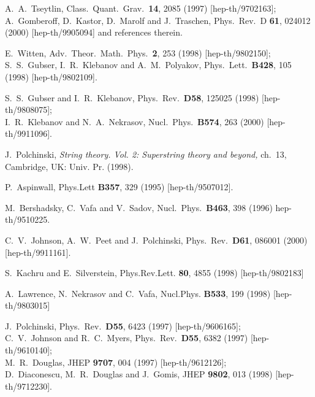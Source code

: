 \documentclass[a4paper,12pt]{article}
\renewcommand{\=}[1]{\bar{#1}}
\begin{document}
\begin{thebibliography}{10}
A.~A.~Tseytlin,
Class.\ Quant.\ Grav.\  {\bf 14}, 2085 (1997)
[hep-th/9702163];\\
A.~Gomberoff, D.~Kastor, D.~Marolf and J.~Traschen,
Phys.\ Rev.\ D {\bf 61}, 024012 (2000)
[hep-th/9905094] and references therein.

E.~Witten,
Adv.\ Theor.\ Math.\ Phys.\  {\bf 2}, 253 (1998)
[hep-th/9802150];\\
S.~S.~Gubser, I.~R.~Klebanov and A.~M.~Polyakov,
Phys.\ Lett.\  {\bf B428}, 105 (1998)
[hep-th/9802109].

S.~S.~Gubser and I.~R.~Klebanov,
Phys.\ Rev.\  {\bf D58}, 125025 (1998)
[hep-th/9808075];
\\
I.~R.~Klebanov and N.~A.~Nekrasov,
Nucl.\ Phys.\  {\bf B574}, 263 (2000)
[hep-th/9911096].

J.~Polchinski,
{\it String theory. Vol. 2: Superstring theory and beyond,} ch.\ 13,
Cambridge, UK: Univ. Pr. (1998).

P.~Aspinwall,
Phys.Lett {\bf B357}, 329 (1995)
[hep-th/9507012].

 M.~Bershadsky, C.~Vafa and V.~Sadov,
Nucl.\ Phys.\ {\bf B463}, 398 (1996)
hep-th/9510225.

C.~V.~Johnson, A.~W.~Peet and J.~Polchinski,
Phys.\ Rev.\  {\bf D61}, 086001 (2000)
[hep-th/9911161].

S.~Kachru and E.~Silverstein,
Phys.Rev.Lett. {\bf 80}, 4855 (1998)
[hep-th/9802183]

A.~Lawrence, N.~Nekrasov and C.~Vafa,
Nucl.Phys. {\bf B533}, 199 (1998)
[hep-th/9803015]

J.~Polchinski,
Phys.\ Rev.\  {\bf D55}, 6423 (1997)
[hep-th/9606165];
\\
C.~V.~Johnson and R.~C.~Myers,
Phys.\ Rev.\  {\bf D55}, 6382 (1997)
[hep-th/9610140];
\\
M.~R.~Douglas,
JHEP {\bf 9707}, 004 (1997)
[hep-th/9612126];
\\
D.~Diaconescu, M.~R.~Douglas and J.~Gomis,
JHEP {\bf 9802}, 013 (1998)
[hep-th/9712230].


\end{thebibliography}
\end{document}
